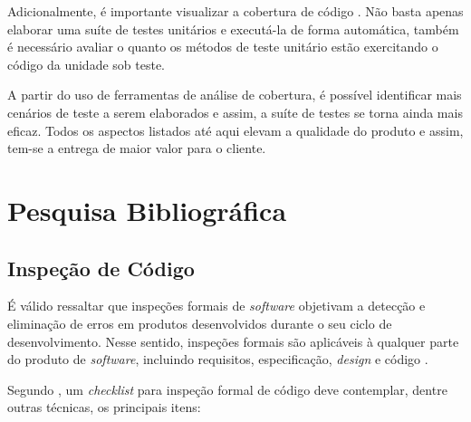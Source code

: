 Adicionalmente, é importante visualizar a cobertura de código \cite{cobertura}. Não basta apenas elaborar uma suíte de testes unitários e executá-la de forma automática, também é necessário avaliar o quanto os métodos de teste unitário estão exercitando o código da unidade sob teste.

A partir do uso de ferramentas de análise de cobertura, é possível identificar mais cenários de teste a serem elaborados e assim, a suíte de testes se torna ainda mais eficaz. Todos os aspectos listados até aqui elevam a qualidade do produto e assim, tem-se a entrega de maior valor para o cliente.

\section{Pesquisa Bibliográfica}

\subsection{Inspeção de Código}

É válido ressaltar que inspeções formais de \textit{software} objetivam a detecção e eliminação de erros em produtos desenvolvidos durante o seu ciclo de desenvolvimento. Nesse sentido, inspeções formais são aplicáveis à qualquer parte do produto de \textit{software}, incluindo requisitos, especificação, \textit{design} e código \cite{inspecao1}.

Segundo \cite{inspecao1}, um \textit{checklist} para inspeção formal de código deve contemplar, dentre outras técnicas, os principais itens:

